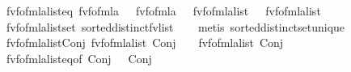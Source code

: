 \begin{isabellebody}
%
\isadelimproof
\isanewline
%
\endisadelimproof
\isanewline
{}\isamarkupfalse%
\ fv{\isacharunderscore}{\kern0pt}fo{\isacharunderscore}{\kern0pt}fmla{\isacharunderscore}{\kern0pt}list{\isacharunderscore}{\kern0pt}eq{\isacharcolon}{\kern0pt}\ {\isachardoublequoteopen}fv{\isacharunderscore}{\kern0pt}fo{\isacharunderscore}{\kern0pt}fmla\ {\isasymphi}\ {\isacharequal}{\kern0pt}\ fv{\isacharunderscore}{\kern0pt}fo{\isacharunderscore}{\kern0pt}fmla\ {\isasympsi}\ {\isasymLongrightarrow}\ fv{\isacharunderscore}{\kern0pt}fo{\isacharunderscore}{\kern0pt}fmla{\isacharunderscore}{\kern0pt}list\ {\isasymphi}\ {\isacharequal}{\kern0pt}\ fv{\isacharunderscore}{\kern0pt}fo{\isacharunderscore}{\kern0pt}fmla{\isacharunderscore}{\kern0pt}list\ {\isasympsi}{\isachardoublequoteclose}\isanewline
%
\isadelimproof
\ \ %
\endisadelimproof
%
\isatagproof
{}\isamarkupfalse%
\ fv{\isacharunderscore}{\kern0pt}fo{\isacharunderscore}{\kern0pt}fmla{\isacharunderscore}{\kern0pt}list{\isacharunderscore}{\kern0pt}set\ sorted{\isacharunderscore}{\kern0pt}distinct{\isacharunderscore}{\kern0pt}fv{\isacharunderscore}{\kern0pt}list\isanewline
\ \ \isamarkupfalse%
\ {\isacharparenleft}{\kern0pt}metis\ sorted{\isacharunderscore}{\kern0pt}distinct{\isacharunderscore}{\kern0pt}set{\isacharunderscore}{\kern0pt}unique{\isacharparenright}{\kern0pt}%
\endisatagproof
{\isafoldproof}%
%
\isadelimproof
\isanewline
%
\endisadelimproof
\isanewline
{}\isamarkupfalse%
\ fv{\isacharunderscore}{\kern0pt}fo{\isacharunderscore}{\kern0pt}fmla{\isacharunderscore}{\kern0pt}list{\isacharunderscore}{\kern0pt}Conj{\isacharcolon}{\kern0pt}\ {\isachardoublequoteopen}fv{\isacharunderscore}{\kern0pt}fo{\isacharunderscore}{\kern0pt}fmla{\isacharunderscore}{\kern0pt}list\ {\isacharparenleft}{\kern0pt}Conj\ {\isasymphi}\ {\isasympsi}{\isacharparenright}{\kern0pt}\ {\isacharequal}{\kern0pt}\ fv{\isacharunderscore}{\kern0pt}fo{\isacharunderscore}{\kern0pt}fmla{\isacharunderscore}{\kern0pt}list\ {\isacharparenleft}{\kern0pt}Conj\ {\isasympsi}\ {\isasymphi}{\isacharparenright}{\kern0pt}{\isachardoublequoteclose}\isanewline
%
\isadelimproof
\ \ %
\endisadelimproof
%
\isatagproof
{}\isamarkupfalse%
\ fv{\isacharunderscore}{\kern0pt}fo{\isacharunderscore}{\kern0pt}fmla{\isacharunderscore}{\kern0pt}list{\isacharunderscore}{\kern0pt}eq{\isacharbrackleft}{\kern0pt}of\ {\isachardoublequoteopen}Conj\ {\isasymphi}\ {\isasympsi}{\isachardoublequoteclose}\ {\isachardoublequoteopen}Conj\ {\isasympsi}\ {\isasymphi}{\isachardoublequoteclose}{\isacharbrackright}{\kern0pt}\isanewline

\end{isabellebody}
